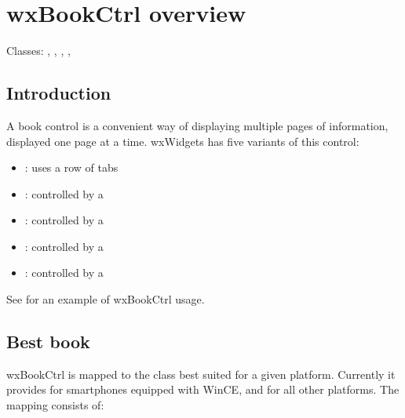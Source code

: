 
\section{wxBookCtrl overview}\label{wxbookctrloverview}

Classes: , , ,
, 

\subsection{Introduction}\label{wxbookctrlintro}

A book control is a convenient way of displaying multiple pages of information,
displayed one page at a time. wxWidgets has five variants of this control:

\begin{itemize}\itemsep=0pt
\item {}: uses a row of tabs
\item {}: controlled by a 
\item {}: controlled by a 
\item {}: controlled by a 
\item {}: controlled by a 
\end{itemize}

See  for an example of wxBookCtrl usage.

\subsection{Best book}\label{wxbestbookctrl}

wxBookCtrl is mapped to the class best suited for a given platform.
Currently it provides  for smartphones equipped with
WinCE, and  for all other platforms. The mapping consists of:

